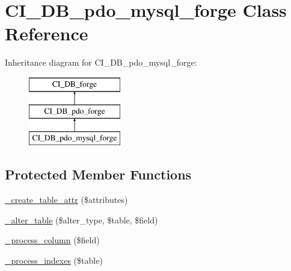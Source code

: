 \hypertarget{class_c_i___d_b__pdo__mysql__forge}{}\section{C\+I\+\_\+\+D\+B\+\_\+pdo\+\_\+mysql\+\_\+forge Class Reference}
\label{class_c_i___d_b__pdo__mysql__forge}
Inheritance diagram for C\+I\+\_\+\+D\+B\+\_\+pdo\+\_\+mysql\+\_\+forge\+:\begin{figure}[H]
\begin{center}
\leavevmode
\includegraphics[height=3.000000cm]{class_c_i___d_b__pdo__mysql__forge}
\end{center}
\end{figure}
\subsection*{Protected Member Functions}
\begin{DoxyCompactItemize}
\item 
\mbox{\hyperlink{class_c_i___d_b__pdo__mysql__forge_ab1b0b9d834983c9c729049acbbf0074b}{\+\_\+create\+\_\+table\+\_\+attr}} (\$attributes)
\item 
\mbox{\hyperlink{class_c_i___d_b__pdo__mysql__forge_ad94713741032d7385563501107e398bd}{\+\_\+alter\+\_\+table}} (\$alter\+\_\+type, \$table, \$field)
\item 
\mbox{\hyperlink{class_c_i___d_b__pdo__mysql__forge_aca63347c0a9f8df78e344f293ad22b9d}{\+\_\+process\+\_\+column}} (\$field)
\item 
\mbox{\hyperlink{class_c_i___d_b__pdo__mysql__forge_a547cffc8831bef6f3b15615afef6d6f2}{\+\_\+process\+\_\+indexes}} (\$table)
\end{DoxyCompactItemize}
